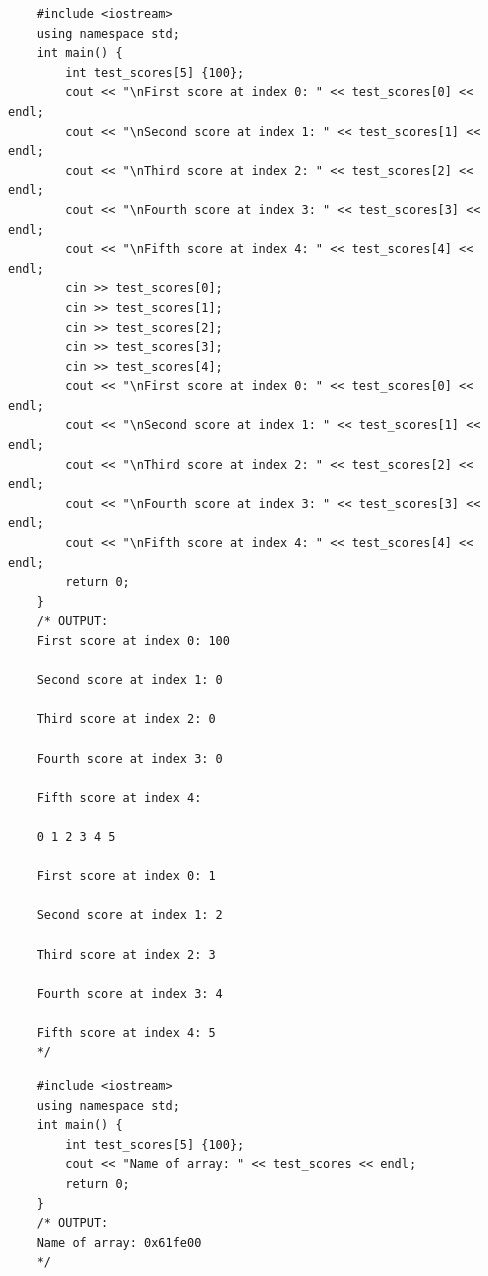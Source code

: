 \begin{verbatim}
    #include <iostream>
    using namespace std;
    int main() {
        int test_scores[5] {100};
        cout << "\nFirst score at index 0: " << test_scores[0] << endl;
        cout << "\nSecond score at index 1: " << test_scores[1] << endl;
        cout << "\nThird score at index 2: " << test_scores[2] << endl;
        cout << "\nFourth score at index 3: " << test_scores[3] << endl;
        cout << "\nFifth score at index 4: " << test_scores[4] << endl;
        cin >> test_scores[0];
        cin >> test_scores[1];
        cin >> test_scores[2];
        cin >> test_scores[3];
        cin >> test_scores[4];
        cout << "\nFirst score at index 0: " << test_scores[0] << endl;
        cout << "\nSecond score at index 1: " << test_scores[1] << endl;
        cout << "\nThird score at index 2: " << test_scores[2] << endl;
        cout << "\nFourth score at index 3: " << test_scores[3] << endl;
        cout << "\nFifth score at index 4: " << test_scores[4] << endl;
        return 0;
    } 
    /* OUTPUT:
    First score at index 0: 100

    Second score at index 1: 0

    Third score at index 2: 0

    Fourth score at index 3: 0

    Fifth score at index 4:  
    
    0 1 2 3 4 5

    First score at index 0: 1

    Second score at index 1: 2

    Third score at index 2: 3

    Fourth score at index 3: 4

    Fifth score at index 4: 5
    */
\end{verbatim}

\begin{verbatim}
    #include <iostream>
    using namespace std;
    int main() {
        int test_scores[5] {100};
        cout << "Name of array: " << test_scores << endl;
        return 0;
    } 
    /* OUTPUT:
    Name of array: 0x61fe00
    */
\end{verbatim}


